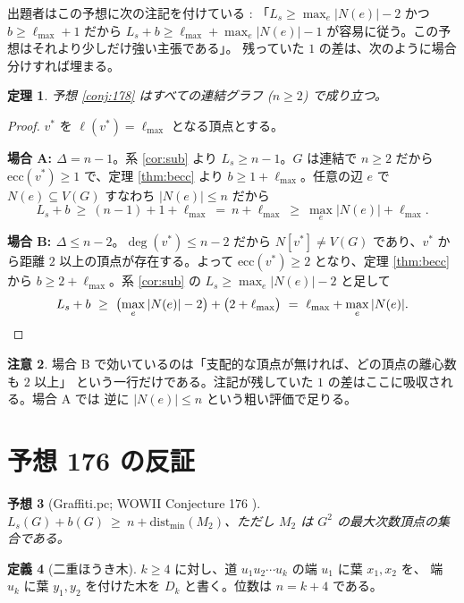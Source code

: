 \documentclass[paper=a4,fontsize=10.5pt,jafontsize=10.5pt]{jlreq}
\theoremstyle{plain}
\newtheorem{theorem}{定理}[section]
\newtheorem{conjecture}[theorem]{予想}
\theoremstyle{definition}
\newtheorem{definition}[theorem]{定義}
\newtheorem{remark}[theorem]{注意}
\begin{document}
出題者はこの予想に次の注記を付けている \cite{wowii}: 「$L_s \ge \max_e |N(e)|
- 2$ かつ $b \ge \ell_{\max} + 1$ だから $L_s + b \ge \ell_{\max} +
\max_e |N(e)| - 1$ が容易に従う。この予想はそれより少しだけ強い主張である」。
残っていた $1$ の差は、次のように場合分けすれば埋まる。

\begin{theorem}\label{thm:178}
予想 \ref{conj:178} はすべての連結グラフ ($n \ge 2$) で成り立つ。
\end{theorem}

\begin{proof}
$v^*$ を $\ell(v^*) = \ell_{\max}$ となる頂点とする。

\textbf{場合 A: $\Delta = n - 1$}。系 \ref{cor:sub} より
$L_s \ge n - 1$。$G$ は連結で $n \ge 2$ だから
$\mathrm{ecc}(v^*) \ge 1$ で、定理 \ref{thm:becc} より
$b \ge 1 + \ell_{\max}$。任意の辺 $e$ で $N(e) \subseteq V(G)$ すなわち
$|N(e)| \le n$ だから
\[ L_s + b \ \ge \ (n-1) + 1 + \ell_{\max}
   \ = \ n + \ell_{\max} \ \ge \ \max_e |N(e)| + \ell_{\max}. \]

\textbf{場合 B: $\Delta \le n - 2$}。$\deg(v^*) \le n - 2$ だから
$N[v^*] \ne V(G)$ であり、$v^*$ から距離 $2$ 以上の頂点が存在する。よって
$\mathrm{ecc}(v^*) \ge 2$ となり、定理 \ref{thm:becc} から
$b \ge 2 + \ell_{\max}$。系 \ref{cor:sub} の
$L_s \ge \max_e |N(e)| - 2$ と足して
\[ L_s + b \ \ge \ \bigl(\max_e |N(e)| - 2\bigr)
   + \bigl(2 + \ell_{\max}\bigr)
   \ = \ \ell_{\max} + \max_e |N(e)|. \qedhere \]
\end{proof}

\begin{remark}
場合 B で効いているのは「支配的な頂点が無ければ、どの頂点の離心数も $2$ 以上」
という一行だけである。注記が残していた $1$ の差はここに吸収される。場合 A では
逆に $|N(e)| \le n$ という粗い評価で足りる。
\end{remark}

\section{予想 176 の反証}\label{sec:176}

\begin{conjecture}[Graffiti.pc; WOWII Conjecture 176 \cite{wowii}]
\label{conj:176}
$L_s(G) + b(G) \ \ge \ n + \mathrm{dist}_{\min}(M_2)$、ただし $M_2$ は
$G^2$ の最大次数頂点の集合である。
\end{conjecture}

\begin{definition}[二重ほうき木]\label{def:broom}
$k \ge 4$ に対し、道 $u_1 u_2 \cdots u_k$ の端 $u_1$ に葉 $x_1, x_2$ を、
端 $u_k$ に葉 $y_1, y_2$ を付けた木を $D_k$ と書く。位数は $n = k + 4$ である。
\end{definition}
\end{document}

